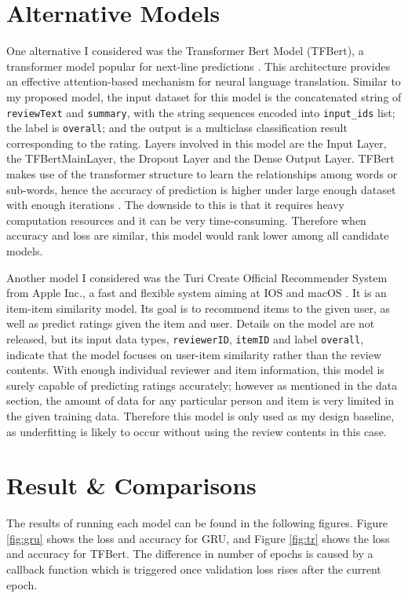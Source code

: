 \documentclass[12pt]{article}
\begin{document}
\section{Alternative Models}
One alternative I considered was the Transformer Bert Model (TFBert), a transformer model popular for next-line predictions \cite{BERT, trans}. This architecture provides an effective attention-based mechanism for neural language translation. Similar to my proposed model, the input dataset for this model is the concatenated string of \texttt{reviewText} and \texttt{summary}, with the string sequences encoded into \texttt{input\_ids} list; the label is \texttt{overall}; and the output is a multiclass classification result corresponding to the rating. Layers involved in this model are the Input Layer, the TFBertMainLayer, the Dropout Layer and the Dense Output Layer. TFBert makes use of the transformer structure to learn the relationships among words or sub-words, hence the accuracy of prediction is higher under large enough dataset with enough iterations \cite{BERTpros}. The downside to this is that it requires heavy computation resources and it can be very time-consuming. Therefore when accuracy and loss are similar, this model would rank lower among all candidate models. 

Another model I considered was the Turi Create Official Recommender System from Apple Inc.,  a fast and flexible system aiming at IOS and macOS \cite{graph}. It is an item-item similarity model. Its goal is to recommend items to the given user, as well as predict ratings given the item and user. Details on the model are not released, but its input data types, \texttt{reviewerID}, \texttt{itemID} and label \texttt{overall}, indicate that the model focuses on user-item similarity rather than the review contents. With enough individual reviewer and item information, this model is surely capable of predicting ratings accurately; however as mentioned in the data section, the amount of data for any particular person and item is very limited in the given training data. Therefore this model is only used as my design baseline, as underfitting is likely to occur without using the review contents in this case.

\section{Result \& Comparisons}
The results of running each model can be found in the following figures. Figure \ref{fig:gru} shows the loss and accuracy for GRU, and Figure \ref{fig:tr} shows the loss and accuracy for TFBert. The difference in number of epochs is caused by a callback function which is triggered once validation loss rises after the current epoch.
\end{document}
